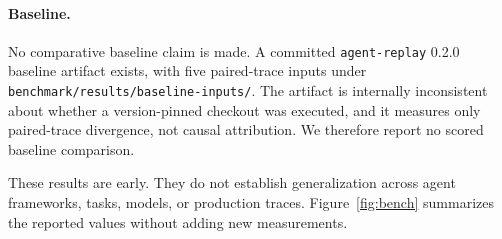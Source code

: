 \documentclass[11pt]{article}
\newcommand{\code}[1]{\textcolor{codegreen}{\texttt{#1}}}
\begin{document}
\paragraph{Baseline.}
No comparative baseline claim is made. A committed \code{agent-replay} 0.2.0 baseline artifact exists, with five paired-trace inputs under \code{benchmark/results/baseline-inputs/}. The artifact is internally inconsistent about whether a version-pinned checkout was executed, and it measures only paired-trace divergence, not causal attribution. We therefore report no scored baseline comparison.

\vspace{1em}   

These results are early. They do not establish generalization across agent frameworks, tasks, models, or production traces. Figure~\ref{fig:bench} summarizes the reported values without adding new measurements.
\end{document}
